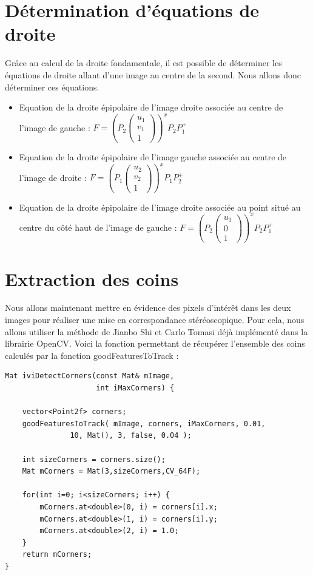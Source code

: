 \documentclass[a4paper,10pt]{article}
\begin{document}
\section{Détermination d'équations de droite}
Grâce au calcul de la droite fondamentale, il est possible de déterminer les équations de droite
allant d'une image au centre de la second. Nous allons donc déterminer ces équations.
\begin{itemize}
 \item Equation de la droite épipolaire de l'image droite associée au centre de l'image de gauche :
 $F=(P_2\begin{pmatrix}u_1\\v_1\\1\end{pmatrix})^xP_2P^+_1$
 \item Equation de la droite épipolaire de l'image gauche associée au centre de l'image de droite :
 $F=(P_1\begin{pmatrix}u_2\\v_2\\1\end{pmatrix})^xP_1P^+_2$
 \item Equation de la droite épipolaire de l'image droite associée au point situé au centre du côté haut de l'image de gauche :
 $F=(P_2\begin{pmatrix}u_1\\0\\1\end{pmatrix})^xP_2P^+_1$
\end{itemize}

\section{Extraction des coins}
Nous allons maintenant mettre en évidence des pixels d'intérêt dans les deux images pour réaliser une mise
en correspondance stéréoscopique. Pour cela, nous allons utiliser la méthode de Jianbo Shi et Carlo Tomasi\cite{323794}
déjà implémenté dans la librairie OpenCV. Voici la fonction permettant de récupérer l'ensemble des coins calculés
par la fonction goodFeaturesToTrack :
\begin{lstlisting}[caption=Calcul des coins]
 Mat iviDetectCorners(const Mat& mImage,
                     int iMaxCorners) {
                   
    vector<Point2f> corners;
    goodFeaturesToTrack( mImage, corners, iMaxCorners, 0.01,
               10, Mat(), 3, false, 0.04 );

    int sizeCorners = corners.size();
    Mat mCorners = Mat(3,sizeCorners,CV_64F);

    for(int i=0; i<sizeCorners; i++) {
        mCorners.at<double>(0, i) = corners[i].x;
        mCorners.at<double>(1, i) = corners[i].y;
        mCorners.at<double>(2, i) = 1.0;
    }
    return mCorners;
}
\end{lstlisting}
\end{document}
